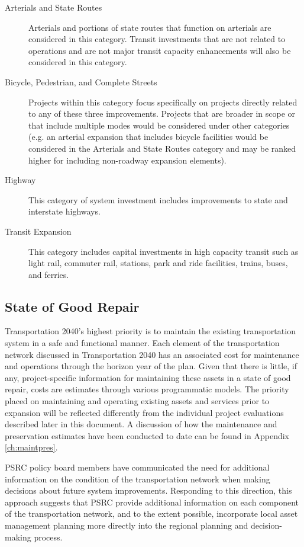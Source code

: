 \documentclass[10pt, letterpaper, final, twoside, onecolumn]{memoir}%
\begin{document}
\begin{description}
\item[Arterials and State Routes]  Arterials and portions of state routes that function on arterials are considered in this category. Transit investments that are not related to operations and are not major transit capacity enhancements will also be considered in this category.
\item[Bicycle, Pedestrian, and Complete Streets] Projects within this category focus specifically on projects directly related to any of these three improvements. Projects that are broader in scope or that include multiple modes would be considered under other categories (e.g. an arterial expansion that includes bicycle facilities would be considered in the Arterials and State Routes category and may be ranked higher for including non-roadway expansion elements).
\item[Highway] This category of system investment includes improvements to state and interstate highways.
\item[Transit Expansion] This category includes capital investments in high capacity transit such as light rail, commuter rail, stations, park and ride facilities, trains, buses, and ferries.
\end{description}


\subsection{State of Good Repair}

Transportation 2040’s highest priority is to maintain the existing transportation system in a safe and functional manner. Each element of the transportation network discussed in Transportation 2040 has an associated cost for maintenance and operations through the horizon year of the plan. Given that there is little, if any, project-specific information for maintaining these assets in a state of good repair, costs are estimates through various programmatic models. The priority placed on maintaining and operating existing assets and services prior to expansion will be reflected differently from the individual project evaluations described later in this document. A discussion of how the maintenance and preservation estimates have been conducted to date can be found in Appendix \ref{ch:maintpres}.

PSRC policy board members have communicated the need for additional information on the condition of the transportation network when making decisions about future system improvements. Responding to this direction, this approach suggests that PSRC provide additional information on each component of the transportation network, and to the extent possible, incorporate local asset management planning more directly into the regional planning and decision-making process.
\end{document}
